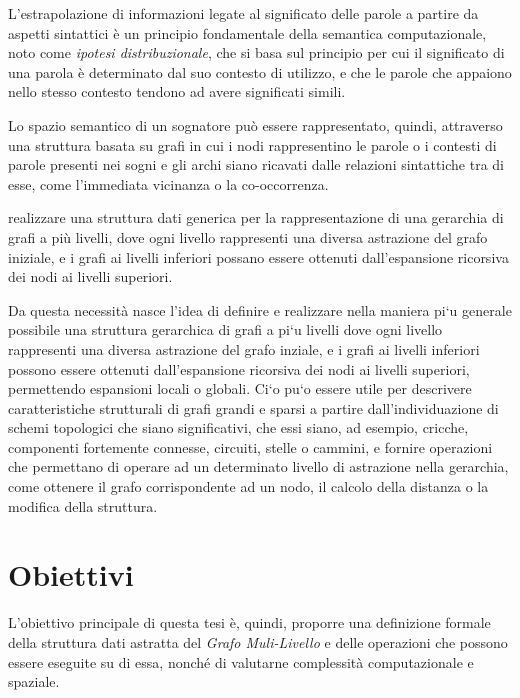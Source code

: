 L'estrapolazione di informazioni legate al significato delle parole a partire da aspetti sintattici \`e un
principio fondamentale della semantica computazionale, noto come \textit{ipotesi distribuzionale}, che si basa sul
principio per cui il significato di una parola \`e determinato dal suo contesto di utilizzo, e che le parole che
appaiono nello stesso contesto tendono ad avere significati simili.\newline

Lo spazio semantico di un sognatore pu\`o essere rappresentato, quindi, attraverso una struttura basata su grafi in cui
i nodi rappresentino le parole o i contesti di parole presenti nei sogni e gli archi siano ricavati dalle relazioni
sintattiche tra di esse, come l'immediata vicinanza o la co-occorrenza. \newline

 realizzare una struttura dati generica per la rappresentazione di una
gerarchia di grafi a pi\`u livelli, dove ogni livello rappresenti una diversa astrazione del grafo iniziale, e i
grafi ai livelli inferiori possano essere ottenuti dall'espansione ricorsiva dei nodi ai livelli superiori. \newline

Da questa necessit\`a nasce l'idea di definire e realizzare nella maniera pi`u generale possibile una struttura
gerarchica di grafi a pi`u livelli dove ogni livello rappresenti una diversa astrazione del grafo inziale,
e i grafi ai livelli inferiori possono essere ottenuti dall’espansione ricorsiva dei nodi ai livelli superiori,
permettendo espansioni locali o globali.
Ci`o pu`o essere utile per descrivere caratteristiche strutturali di grafi grandi e sparsi a partire
dall’individuazione di schemi topologici che siano significativi, che essi siano, ad esempio, cricche, componenti
fortemente connesse, circuiti, stelle o cammini, e fornire operazioni che permettano di operare ad un determinato
livello di astrazione nella gerarchia, come ottenere il grafo corrispondente ad un nodo, il calcolo della distanza
o la modifica della struttura.

\section*{Obiettivi}
L'obiettivo principale di questa tesi \`e, quindi, proporre una definizione formale della struttura dati astratta del
\textit{Grafo Muli-Livello} e delle operazioni che possono essere eseguite su di essa, nonch\'e di valutarne
complessit\`a computazionale e spaziale. \newline

